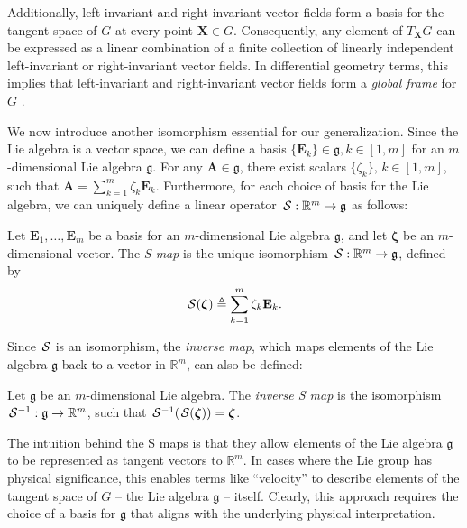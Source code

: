 Additionally, left-invariant and right-invariant vector fields form a basis for the tangent space of $G$ at every point $\mathbf{X} \in G$. Consequently, any element of $T_\mathbf{X}G$ can be expressed as a linear combination of a finite collection of linearly independent left-invariant or right-invariant vector fields. In differential geometry terms, this implies that left-invariant and right-invariant vector fields form a \emph{global frame} for $G$ \citep[p. 192]{Lee2012}.

We now introduce another isomorphism essential for our generalization. Since the Lie algebra is a vector space, we can define a basis $\{\mathbf{E}_k\}\in\mathfrak{g}, k\in[1,m]$ for an $m$-dimensional Lie algebra $\mathfrak{g}$. For any $\mathbf{A} \in\mathfrak{g}$, there exist scalars $\{\zeta_k\},\, k\in[1,m]$, such that $\mathbf{A} = \sum_{k=1}^{m} \zeta_k\mathbf{E}_k$. Furthermore, for each choice of basis for the Lie algebra, we can uniquely define a linear operator $\SL:\mathbb{R}^{m}\to\mathfrak{g}$ as follows:
\begin{definition}[S map]\label{def:SL-left-isomorphism-act-on-xi}
    Let $\mathbf{E}_1,\dots,\mathbf{E}_m$ be a basis for an $m$-dimensional Lie algebra $\mathfrak{g}$, and let $\boldsymbol{\zeta}$ be an $m$-dimensional vector. The \emph{S map} is the unique isomorphism $\SL:\mathbb{R}^{m}\to\mathfrak{g}$, defined by
    \begin{align}
        \SL[\boldsymbol{\zeta}] \triangleq \sum_{k=1}^m\zeta_k\mathbf{E}_k.    
    \end{align}
\end{definition}
Since $\SL$ is an isomorphism, the \emph{inverse map}, which maps elements of the Lie algebra $\mathfrak{g}$ back to a vector in $\mathbb{R}^m$, can also be defined:
\begin{definition}\label{def:inverse-isomorphism-SLinv}
    Let $\mathfrak{g}$ be an $m$-dimensional Lie algebra. The \emph{inverse S map} is the isomorphism $\invSL:\mathfrak{g}\to\mathbb{R}^m$, such that $\invSL[\SL[\boldsymbol{\zeta}]] = \boldsymbol{\zeta}$. 
\end{definition}
The intuition behind the S maps is that they allow elements of the Lie algebra $\mathfrak{g}$ to be represented as tangent vectors to $\mathbb{R}^m$. In cases where the Lie group has physical significance, this enables terms like ``velocity'' to describe elements of the tangent space of $G$ -- the Lie algebra $\mathfrak{g}$ -- itself. Clearly, this approach requires the choice of a basis for $\mathfrak{g}$ that aligns with the underlying physical interpretation.
